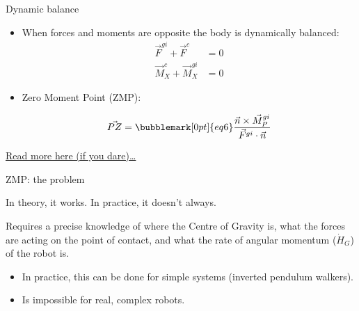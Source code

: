 \documentclass[compress]{beamer}
\begin{document}
\begin{frame}{Dynamic balance}

    \begin{itemize}

        \item<1-> When forces and moments are opposite the body is dynamically balanced:
            \begin{align*}
                \vec{F}^{gi} + \vec{F}^c &= 0 \\
                \vec{M}_X^c + \vec{M}_X^{gi} &= 0
            \end{align*}

        \item<2-> Zero Moment Point (ZMP):

            \[
                \vec{PZ} =\bubblemark[0pt]{eq6} \frac{\vec{n} \times \vec{M}_P^{gi}}{\vec{F}^{gi}\cdot \vec{n}}
            \]

    \end{itemize}


    \vspace{4em}

    \href{http://ieeexplore.ieee.org/stamp/stamp.jsp?tp=\&arnumber=1325327}{Read
    more here (if you dare)\ldots{}}

\end{frame}

\begin{frame}{ZMP: the problem}

    In theory, it works. In practice, it doesn't always.

    Requires a precise knowledge of where the Centre of Gravity is, what the
    forces are acting on the point of contact, and what the rate of angular
    momentum ($\dot{H}_G$) of the robot is.

    \begin{itemize}

        \item In practice, this can be done for simple systems (inverted pendulum
            walkers).
        \item Is impossible for real, complex robots.
    \end{itemize}

\end{frame}
\end{document}
